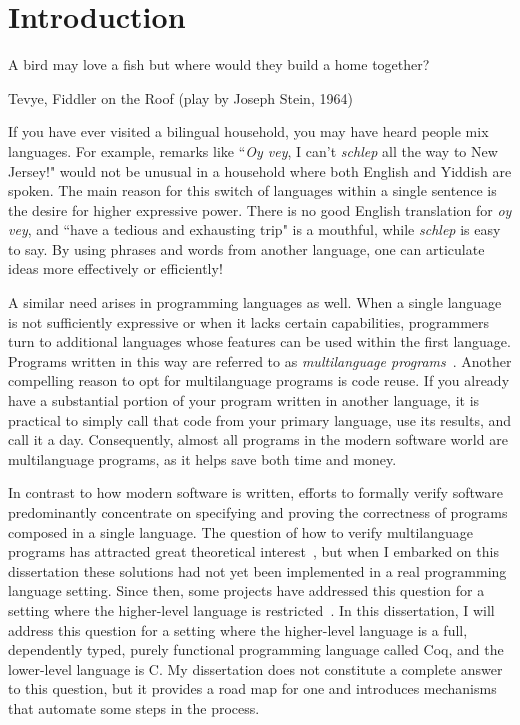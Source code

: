 \chapter{Introduction}
\label{introduction}

\epigraph{A bird may love a fish but where would they build a home together?}{Tevye, Fiddler on the Roof (play by Joseph Stein, 1964)}

If you have ever visited a bilingual household, you may have heard people mix languages. For example, remarks like ``\textit{Oy vey}, I can't \textit{schlep} all the way to New Jersey!" would not be unusual in a household where both English and Yiddish are spoken. The main reason for this switch of languages within a single sentence is the desire for higher expressive power. There is no good English translation for \textit{oy vey}, and ``have a tedious and exhausting trip" is a mouthful, while \textit{schlep} is easy to say. By using phrases and words from another language, one can articulate ideas more effectively or efficiently!

A similar need arises in programming languages as well.
When a single language is not sufficiently expressive or when it lacks certain capabilities, programmers turn to additional languages whose features can be used within the first language. Programs written in this way are referred to as \emph{multilanguage programs}~\cite{matthews2008meaning}.
Another compelling reason to opt for multilanguage programs is code reuse. If you already have a substantial portion of your program written in another language, it is practical to simply call that code from your primary language, use its results, and call it a day. Consequently, almost all programs in the modern software world are multilanguage programs, as it helps save both time and money.
\newpage

In contrast to how modern software is written, efforts to formally verify software predominantly concentrate on specifying and proving the correctness of programs composed in a single language.
The question of how to verify multilanguage programs has attracted great theoretical interest~\cite{ahmed2015verified, patterson2017, patterson2022, patterson2023}, but when I embarked on this dissertation  these solutions had not yet been implemented in a real programming language setting.
Since then, some projects have addressed this question for a setting where the higher-level language is restricted~\cite{cheung2022, gueneau2023melocoton}. In this dissertation, I will address this question for a setting where the higher-level language is a full, dependently typed, purely functional programming language called Coq, and the lower-level language is C. My dissertation does not constitute a complete answer to this question, but it provides a road map for one and introduces mechanisms that automate some steps in the process.

